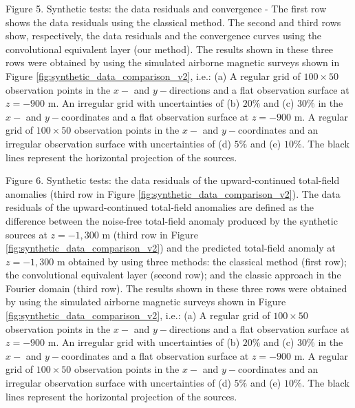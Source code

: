 \documentclass[manuscript,noblind]{geophysics}
\begin{document}
{
	{Figure 5. Synthetic tests: the data residuals and convergence - The first row shows the data residuals using the classical method. The second and third rows show, respectively, the data residuals and the convergence curves using the convolutional equivalent layer (our method). The results shown in these three rows were obtained by using the simulated airborne magnetic surveys shown in Figure \ref{fig:synthetic_data_comparison_v2}, i.e.: (a) A regular grid of $100 \times 50$ observation points in the $x-$ and $y-$directions and a flat observation surface at $z= -900$ m. An irregular grid with uncertainties of (b) $20\%$ and (c) $30\%$   in the $x-$ and $y-$coordinates and a flat observation surface at $z= - 900$ m. A regular grid  of $100 \times 50$ observation points in the $x-$ and $y-$coordinates and an irregular observation surface with uncertainties of (d) $5\%$ and  (e) $10\%$. The black lines represent the horizontal projection of the sources.}
	\label{fig:synthetic_residuals_convergence_comparison_v2}
}


{
	{Figure 6. Synthetic tests: the data residuals of the upward-continued total-field anomalies (third row in Figure \ref{fig:synthetic_data_comparison_v2}). The data residuals of the upward-continued total-field anomalies are defined as the difference between the noise-free total-field anomaly produced by the synthetic sources at $z = -1,300$ m (third  row in Figure \ref{fig:synthetic_data_comparison_v2}) and the predicted total-field anomaly at $z = -1,300$ m  obtained by using three methods: the classical method (first row); the convolutional equivalent layer (second row); and the classic approach in the Fourier domain (third row). The results shown in these three rows were obtained by using the simulated airborne magnetic surveys shown in Figure \ref{fig:synthetic_data_comparison_v2}, i.e.: (a) A regular grid of $100 \times 50$ observation points in the $x-$ and $y-$directions and a flat observation surface at $z= -900$ m. An irregular grid with uncertainties of (b) $20\%$ and (c) $30\%$   in the $x-$ and $y-$coordinates and a flat observation surface at $z= - 900$ m.	A regular grid  of $100 \times 50$ observation points in the $x-$ and $y-$coordinates and an irregular observation surface with uncertainties of (d) $5\%$ and  (e) $10\%$. The black lines represent the horizontal projection of the sources.}
	\label{fig:synthetic_upward_residuals_comparison_v2}
}
\end{document}
